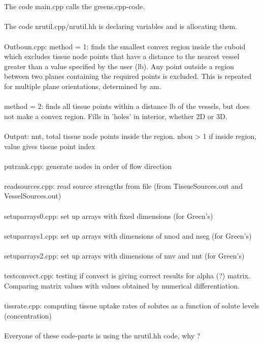 \\
\\The code main.cpp calls the greens.cpp-code.
\\
\\The code nrutil.cpp/nrutil.hh is declaring variables and is allocating them.
\\
\\Outboun.cpp: method = 1: finds the smallest convex region inside the cuboid
which excludes tissue node points that have a distance to the nearest
vessel greater than a value specified by the user (lb).  Any point
outside a region between two planes containing the required points is
excluded.  This is repeated for multiple plane orientations, determined by am.
\\
\\method = 2: finds all tissue points within a distance lb of the vessels, but
does not make a convex region.  Fills in 'holes' in interior, whether 2D or 3D.
\\
\\Output:	nnt, total tissue node points inside the region.
nbou > 1 if inside region, value gives tissue point index
\\
\\putrank.cpp: generate nodes in order of flow direction
\\
\\readsources.cpp: read source strengths from file (from TissueSources.out and VesselSources.out)
\\
\\setuparrays0.cpp: set up arrays with fixed dimensions (for Green's)
\\
\\setuparrays1.cpp: set up arrays with dimensions of nnod and nseg (for Green's)
\\
\\setuparrays2.cpp: set up arrays with dimensions of nnv and nnt (for Green's)
\\
\\testconvect.cpp: testing if convect is giving correct results for alpha (?) matrix. Comparing matrix values with values obtained by numerical differentiation.
\\
\\tissrate.cpp: computing tissue uptake rates of solutes as a function of solute levels (concentration)
\\
\\Everyone of these code-parts is using the nrutil.hh code, why ?


